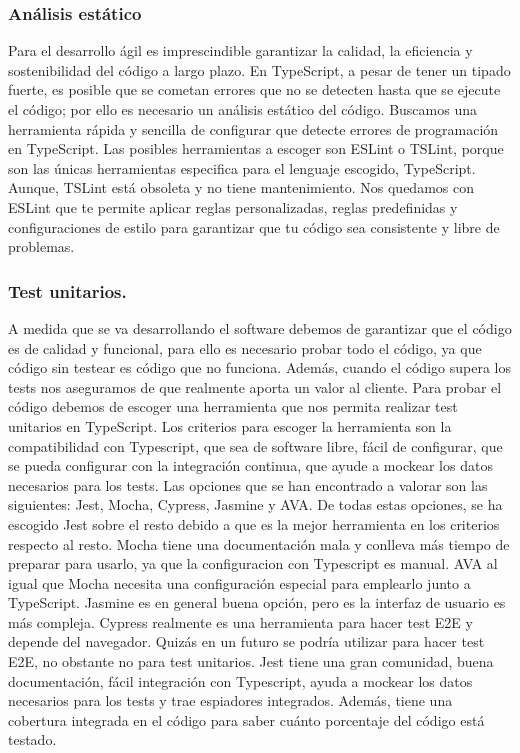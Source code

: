 \subsubsection{Análisis estático}
Para el desarrollo ágil es imprescindible garantizar la calidad, la eficiencia y sostenibilidad del código a largo plazo.
En TypeScript, a pesar de tener un tipado fuerte, es posible que se cometan errores que no se detecten hasta que se ejecute el código; por ello es necesario un análisis estático del código.
Buscamos una herramienta rápida y sencilla de configurar que detecte errores de programación en TypeScript.
Las posibles herramientas a escoger son ESLint o TSLint, porque son las únicas herramientas especifica para el lenguaje escogido, TypeScript. Aunque, TSLint está obsoleta y no tiene mantenimiento.
Nos quedamos con ESLint que te permite aplicar reglas personalizadas, reglas predefinidas y configuraciones de estilo para garantizar que tu código sea consistente y libre de problemas.

\subsubsection{Test unitarios.}
A medida que se va desarrollando el software debemos de garantizar que el código es de calidad y funcional, para ello es necesario probar todo el código, ya que código sin
testear es código que no funciona. Además, cuando el código supera los tests nos aseguramos de que realmente aporta un valor al cliente.
Para probar el código debemos de escoger una herramienta que nos permita realizar test unitarios en TypeScript.
Los criterios para escoger la herramienta son la compatibilidad con Typescript, que sea de software libre, fácil de configurar, que se pueda configurar con la integración continua,
que ayude a mockear los datos necesarios para los tests.
Las opciones que se han encontrado a valorar son las siguientes: Jest, Mocha, Cypress, Jasmine y AVA. De todas estas opciones, se ha escogido Jest sobre el resto debido a que es la
mejor herramienta en los criterios respecto al resto. Mocha tiene una documentación mala y conlleva más tiempo de preparar para usarlo, ya que la configuracion con Typescript es manual.
AVA al igual que Mocha necesita una configuración especial para emplearlo junto a TypeScript. Jasmine es en general buena opción, pero es la interfaz de usuario es más compleja.
Cypress realmente es una herramienta para hacer test E2E y depende del navegador. Quizás en un futuro se podría utilizar para hacer test E2E, no obstante no para test unitarios.
Jest tiene una gran comunidad, buena documentación, fácil integración con Typescript, ayuda a mockear los datos necesarios para los tests y trae espiadores integrados.
Además, tiene una cobertura integrada en el código para saber cuánto porcentaje del código está testado.

